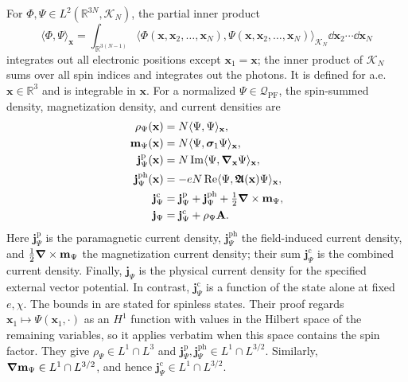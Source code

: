 \documentclass[final,reqno]{amsart}
\theoremstyle{remark}
\newcommand{\RR}{\mathbb{R}}
\newcommand{\dua}[2]{\langle #1, #2 \rangle}
\newcommand{\AF}{\bm{\mathfrak{A}}}
\newcommand{\vjp}{\mathbf{j}^{\mathrm{p}}}
\newcommand{\vjph}{\mathbf{j}^{\mathrm{ph}}}
\newcommand{\vjc}{\mathbf{j}^{\mathrm{c}}}
\newcommand{\PF}{\mathrm{PF}}
\newcommand{\vsigma}{{\bm{\sigma}}}
\newcommand{\vm}{\mathbf{m}}
\newcommand{\vx}{\mathbf{x}}
\newcommand{\vj}{\mathbf{j}}
\newcommand{\vA}{{\mathbf{A}}}
\begin{document}
For $\Phi,\Psi\in L^2(\RR^{3N},\mathcal K_N)$, the partial inner
product
\[
 \dua{\Phi}{\Psi}_\vx
 =\int_{\RR^{3(N-1)}}
   \dua{\Phi(\vx,\vx_2,\ldots,\vx_N)}{\Psi(\vx,\vx_2,\ldots,\vx_N)}_{\mathcal K_N}
   \dd\vx_2\cdots\dd\vx_N
\]
integrates out all electronic positions except $\vx_1=\vx$; the inner
product of $\mathcal K_N$ sums over all spin indices and integrates
out the photons.  It is defined for a.e.\ $\vx\in\RR^3$ and is
integrable in $\vx$.
For a normalized $\Psi\in\mathcal Q_\PF$, the spin-summed density,
magnetization density, and current densities are
\begin{align}
 \rho_\Psi(\vx)&=N\dua{\Psi}{\Psi}_\vx,\notag\\
 \vm_\Psi(\vx)&=N\dua{\Psi}{\vsigma_1\Psi}_\vx,\notag\\
 \vjp_\Psi(\vx)&=N\Im\dua{\Psi}{\grad_\vx\Psi}_\vx,\notag\\
 \vjph_\Psi(\vx)&=-eN\Re\dua{\Psi}{\AF(\vx)\Psi}_\vx,\notag\\
 \vjc_\Psi&=\vjp_\Psi+\vjph_\Psi+\tfrac12\grad\times\vm_\Psi,
 \notag\\
 \vj_\Psi&=\vjc_\Psi+\rho_\Psi\vA.
 \label{physical-current-def}
\end{align}
Here $\vjp_\Psi$ is the paramagnetic current density, $\vjph_\Psi$
the field-induced current density, and $\frac12\grad\times\vm_\Psi$
the magnetization current density; their sum $\vjc_\Psi$ is the
combined current density.  Finally, $\vj_\Psi$ is the physical current
density for the specified external vector potential.  In contrast,
$\vjc_\Psi$ is a function of the state alone at fixed $e,\chi$.  The bounds in \cite[Proposition~4.1]{Q} are stated
for spinless states.  Their proof regards $\vx_1\mapsto\Psi(\vx_1,\cdot)$
as an $H^1$ function with values in the Hilbert space of the remaining
variables, so it applies verbatim when this space contains the spin
factor.  They give $\rho_\Psi\in L^1\cap L^3$ and
$\vjp_\Psi,\vjph_\Psi\in L^1\cap L^{3/2}$.
Similarly, $\grad\vm_\Psi\in L^1\cap L^{3/2}$, and hence
$\vjc_\Psi\in L^1\cap L^{3/2}$.
\end{document}
